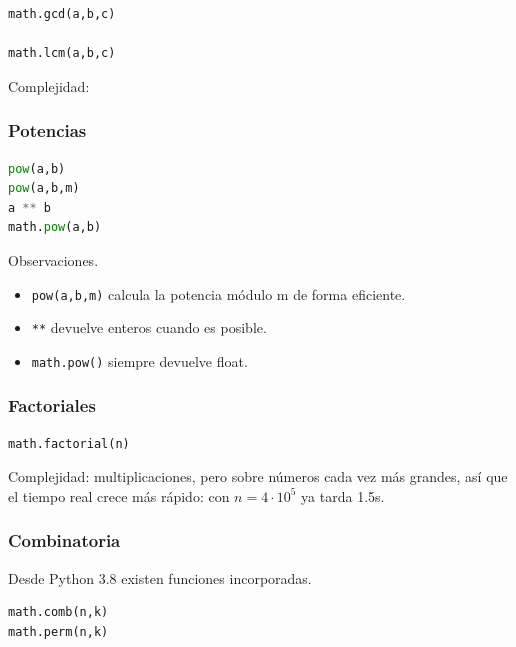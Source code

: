 \begin{lstlisting}[language=Python]
math.gcd(a,b,c)

math.lcm(a,b,c)
\end{lstlisting}

Complejidad: 

\vspace{0.3cm}

\subsubsection{Potencias}

\begin{lstlisting}[language=Python]
pow(a,b)
pow(a,b,m)
a ** b
math.pow(a,b)
\end{lstlisting}

Observaciones.

\begin{itemize}
\item \texttt{pow(a,b,m)} calcula la potencia módulo m de forma eficiente.
\item \texttt{**} devuelve enteros cuando es posible.
\item \texttt{math.pow()} siempre devuelve float.
\end{itemize}

\vspace{0.3cm}

\subsubsection{Factoriales}

\begin{lstlisting}[language=Python]
math.factorial(n)
\end{lstlisting}

Complejidad:  multiplicaciones, pero sobre números cada vez más grandes, así que el tiempo real crece más rápido: con $n = 4\cdot10^5$ ya tarda \aprox{}1.5s.

\vspace{0.3cm}

\subsubsection{Combinatoria}

Desde Python 3.8 existen funciones incorporadas.

\begin{lstlisting}[language=Python]
math.comb(n,k)
math.perm(n,k)
\end{lstlisting}

